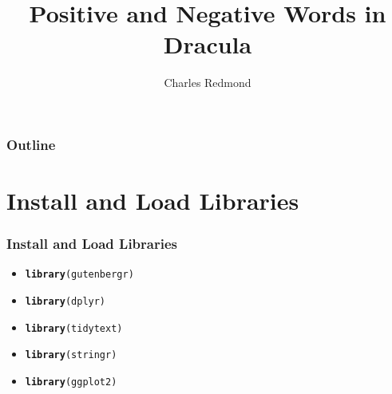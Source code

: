 \documentclass{beamer}\usepackage[]{graphicx}\usepackage[]{color}
\makeatletter
\newcommand{\hlstd}[1]{\textcolor[rgb]{0.345,0.345,0.345}{#1}}%
\newcommand{\hlkwd}[1]{\textcolor[rgb]{0.737,0.353,0.396}{\textbf{#1}}}%
\newenvironment{kframe}{%
 \def\at@end@of@kframe{}%
 \ifinner\ifhmode%
  \def\at@end@of@kframe{\end{minipage}}%
  \begin{minipage}{\columnwidth}%
 \fi\fi%
 \def\FrameCommand##1{\hskip\@totalleftmargin \hskip-\fboxsep
 \colorbox{shadecolor}{##1}\hskip-\fboxsep
     \hskip-\linewidth \hskip-\@totalleftmargin \hskip\columnwidth}%
 \MakeFramed {\advance\hsize-\width
   \@totalleftmargin\z@ \linewidth\hsize
   \@setminipage}}%
 {\par\unskip\endMakeFramed%
 \at@end@of@kframe}
\newenvironment{knitrout}{}{} %
\makeatother
\begin{document}
\title{Positive and Negative Words in Dracula}
\author{Charles Redmond}

\begin{frame}
  \titlepage
\end{frame}

\begin{frame}
  \frametitle{Outline}
    \tableofcontents
\end{frame}

\section{Install and Load Libraries}
\begin{frame}[fragile]
  \frametitle{Install and Load Libraries}
  \begin{itemize}
  \item<1->
\begin{knitrout}
\color{fgcolor}\begin{kframe}
\begin{alltt}
  \hlkwd{library}\hlstd{(gutenbergr)}
\end{alltt}
\end{kframe}
\end{knitrout}
  \item<2->
\begin{knitrout}
\color{fgcolor}\begin{kframe}
\begin{alltt}
  \hlkwd{library}\hlstd{(dplyr)}
\end{alltt}
\end{kframe}
\end{knitrout}
  \item<3->
\begin{knitrout}
\color{fgcolor}\begin{kframe}
\begin{alltt}
  \hlkwd{library}\hlstd{(tidytext)}
\end{alltt}
\end{kframe}
\end{knitrout}
  \item<4->
\begin{knitrout}
\color{fgcolor}\begin{kframe}
\begin{alltt}
  \hlkwd{library}\hlstd{(stringr)}
\end{alltt}
\end{kframe}
\end{knitrout}
  \item<5->
\begin{knitrout}
\color{fgcolor}\begin{kframe}
\begin{alltt}
  \hlkwd{library}\hlstd{(ggplot2)}
\end{alltt}
\end{kframe}
\end{knitrout}
  

\end{itemize}
\end{frame}
\end{document}
